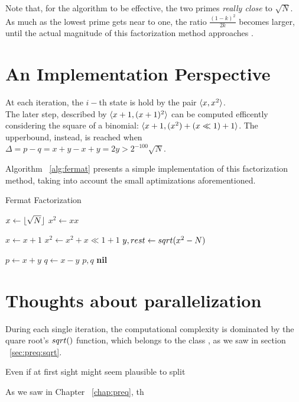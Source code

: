 \begin{remark}
  Note that, for the algorithm to be effective, the two primes
  \emph{really close} to $\sqrt{N}$. As much as the lowest prime gets near to
  one, the ratio $\frac{(1-k)^2}{2k}$ becomes larger, until the actual magnitude
  of this factorization method approaches .
\end{remark}

\section{An Implementation Perspective}

At each iteration, the $i-$th state is hold by the pair $\langle x, x^2\rangle$.\\
The later step, described by $\langle x+1, (x+1)^2\rangle$ can be computed efficently
considering the square of a binomial: $\langle x+1, (x^2) + (x \ll 1) + 1\rangle$.
The upperbound, instead, is reached when
$ \Delta = p - q  = x + y - x + y = 2y > 2^{-100}\sqrt{N}$.

Algorithm ~\ref{alg:fermat} presents a simple implementation of this
factorization method, taking into account the small aptimizations
aforementioned.

\begin{algorithm}
  \caption{Fermat Factorization \label{alg:fermat}}
  \begin{algorithmic}[1]
    \State $x \gets \lfloor\sqrt{N}\rfloor$
    \State $x^2 \gets xx$

    \Repeat
    \State $x \gets x+1$
    \State $x^2 \gets x^2 + x \ll 1 + 1$
    \State $y, rest \gets sqrt(x^2 - N)$

    \State $p \gets x+y$
    \State $q \gets x-y$
    \State \Return $p, q$
    \Else
    \State \Return \textbf{nil}
    \EndIf
    \end{algorithmic}
\end{algorithm}


\section{Thoughts about parallelization}

During each single iteration, the computational complexity is dominated by the
quare root's $\dsqrt$ function, which belongs to the class
, as we saw in section ~\ref{sec:preq:sqrt}.

Even if at first sight might seem plausible to split

As we saw in Chapter ~\ref{chap:preq}, th
